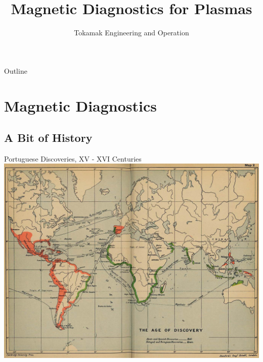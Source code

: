 \documentclass{beamer}
\title[Magnetic Diagnostics]{Magnetic Diagnostics for Plasmas}
\author[ISTTOK training program, 29 July 2021] %
{\href{mailto:bernardo.carvalho@tecnico.ulisboa.pt}
{\nolinkurl{}} 
}
\date[ISTTOK training program 2021] %
{\small Tokamak Engineering and Operation
}
\begin{document}


\begin{frame}
\titlepage
\end{frame}

\begin{frame}{Outline}
  \tableofcontents
\end{frame}




\section{Magnetic Diagnostics}
\subsection*{A Bit of History}
\begin{frame}{Portuguese Discoveries, XV - XVI Centuries}
\includegraphics[width=8.5 cm]{discov}
\end{frame}
\end{document}
